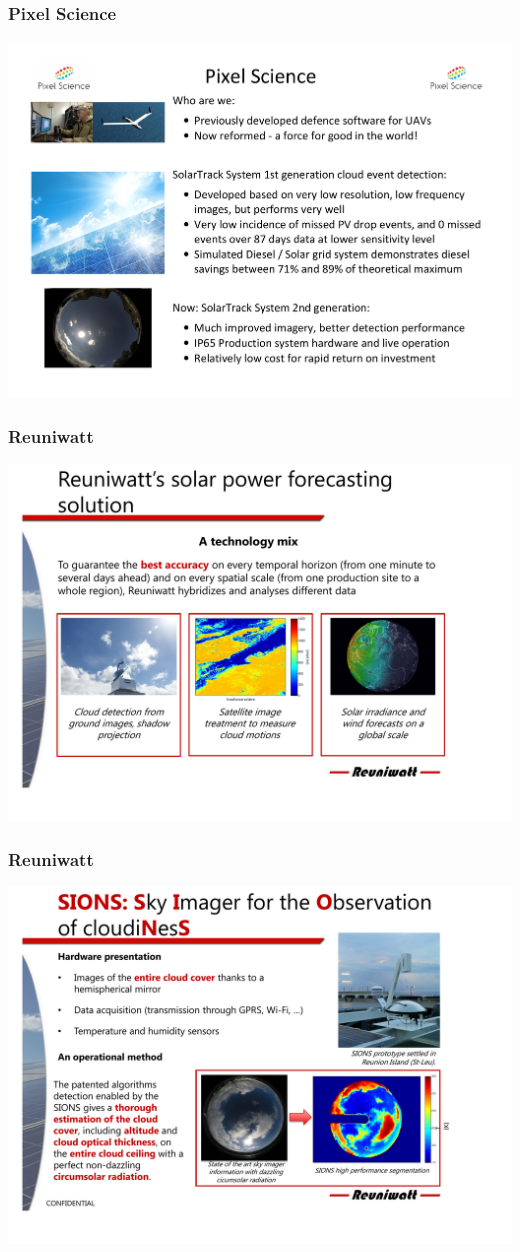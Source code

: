 \documentclass{beamer}
\begin{document}

\begin{frame}\frametitle{Pixel Science}
\includegraphics[width=\hsize]{PixelScience.pdf}
\end{frame}

\begin{frame}\frametitle{Reuniwatt}
\includegraphics[width=\hsize]{Reuniwatt_Nowcasting1.pdf}
\end{frame}

\begin{frame}\frametitle{Reuniwatt}
\includegraphics[width=\hsize]{Reuniwatt_Nowcasting2.pdf}
\end{frame}
\end{document}
